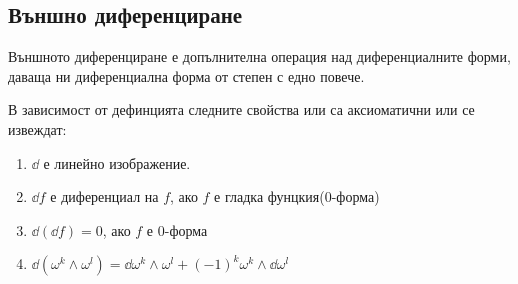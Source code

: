 \documentclass[12pt]{article}
\begin{document}
\begin{large}
\subsection{Външно диференциране}
Външното диференциране е допълнителна операция над диференциалните форми, даваща ни диференциална форма от степен с едно повече.

В зависимост от дефинцията следните свойства или са аксиоматични или се извеждат:
\begin{enumerate}
  \item $\dd$ е линейно изображение.
  \item $\dd f$ е диференциал на $f$, ако $f$ е гладка фунцкия($0$-форма)
  \item $\dd (\dd f)=0$, ако $f$ е $0$-форма
  \item $\dd (\omega^k \wedge \omega^l)=\dd \omega^k \wedge \omega^l + (-1)^k \omega^k \wedge \dd \omega^l$
\end{enumerate}


\end{large}
\end{document}
